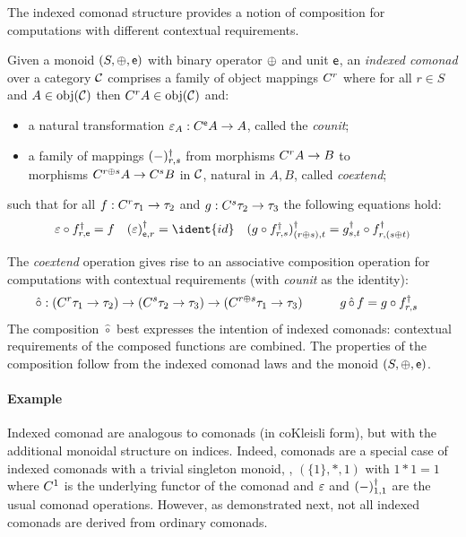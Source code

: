 The indexed comonad structure provides a notion of composition
for computations with different contextual requirements.
\begin{definition}
Given a monoid $(S, \oplus, \mathsf{e})$ with binary operator $\oplus$ and
unit $\mathsf{e}$, an \emph{indexed comonad} over a category $\mathcal{C}$
comprises a family of object mappings $C^{r}$ where for all $r \in S$ and $A \in \textnormal{obj}(\mathcal{C})$ then 
$C^{r} A \in \textnormal{obj}(\mathcal{C})$ and:
\begin{itemize}
\item a natural transformation $\varepsilon_A : C^{\mathsf{e}} A \rightarrow A$, called the \emph{counit};
\item a family of mappings $(-)^\dagger_{r, s}$ from morphisms $C^{r} A \rightarrow B$ to \\ morphisms $C^{r \oplus{} s} A
  \rightarrow C^{s} B$ in $\mathcal{C}$, natural in $A,B$, called
  \emph{coextend};
\end{itemize}
%
\noindent
such that for all $f : C^{r} \tau_1 \rightarrow \tau_2$ and $g : C^{s} \tau_2 \rightarrow \tau_3$ 
the following equations hold:
%
\renewcommand{\arraycolsep}{1.5em}
\begin{align*}
\begin{array}{ccc}
\counit \circ \cobind{f}{r, \iunit} = f & 
\cobind{{(\counit)}}{\iunit, r} = \ident{id} & 
\cobind{(g \circ \cobind{f}{r, s})}{(r \imult s), t} = \cobind{g}{s, t} \circ \cobind{f}{r, (s \imult t)} \\
\end{array}
\end{align*}
\end{definition}
%
The \emph{coextend} operation gives rise to an associative composition operation for
computations with contextual requirements (with \emph{counit} as the identity):
%
\[
\hat{\circ} : (C^{r} \tau_1 \rightarrow \tau_2) \rightarrow (C^{s} \tau_2 \rightarrow \tau_3) 
  \rightarrow (C^{r \oplus s} \tau_1 \rightarrow \tau_3) \quad\quad\quad
g \, \hat{\circ} \, f = g \circ f^\dagger_{r,s}\quad
\]
%
The composition $\hat{\circ}$ best expresses the intention
of indexed comonads: contextual requirements of the composed
functions are combined. The properties of
the composition follow from the indexed comonad laws and the 
monoid $(S, \oplus, \mathsf{e})$.

\paragraph{Example}
Indexed comonad are analogous to comonads (in coKleisli form), but
with the additional monoidal structure on indices.  Indeed, comonads
are a special case of indexed comonads with a trivial singleton
monoid, \eg{}, $(\{1\}, \ast, 1)$ with $1 \ast 1 = 1$ where $C^{1}$
is the underlying functor of the comonad and $\varepsilon$ and
$(-)^\dagger_{1, 1}$ are the usual comonad operations.
However, as demonstrated next, not all indexed comonads are derived from ordinary comonads.

